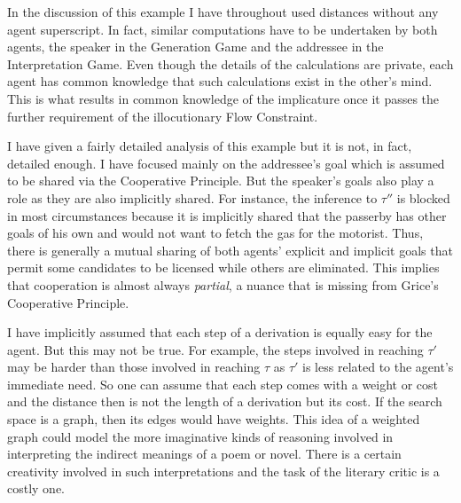 
In the discussion of this example I have throughout used distances without any agent superscript. In fact, similar computations have to be undertaken by both agents, the speaker in the Generation Game and the addressee in the Interpretation Game. Even though the details of the calculations are private, each agent has common knowledge that such calculations exist in the other's mind. This is what results in common knowledge of the implicature once it passes the further requirement of the illocutionary Flow Constraint.

I have given a fairly detailed analysis of this example but it is not, in fact, detailed enough. I have focused mainly on the addressee's goal which is assumed to be shared via the Cooperative Principle. But the speaker's goals also play a role as they are also implicitly shared. For instance, the inference to $\tau''$ is blocked in most circumstances because it is implicitly shared that the passerby has other goals of his own and would not want to fetch the gas for the motorist. Thus, there is generally a mutual sharing of both agents' explicit and implicit goals that permit some candidates to be licensed while others are eliminated. This implies that cooperation is almost always \emph{partial}, a nuance that is missing from Grice's Cooperative Principle.

I have implicitly assumed that each step of a derivation is equally easy for the agent. But this may not be true. For example, the steps involved in reaching $\tau'$ may be harder than those involved in reaching $\tau$  as $\tau'$ is less related to the agent's immediate need. So one can assume that each step comes with a weight or cost and the distance then is not the length of a derivation but its cost. If the search space is a graph, then its edges would have weights. This idea of a weighted graph could model the more imaginative kinds of reasoning involved in interpreting the indirect meanings of a poem or novel. There is a certain creativity involved in such interpretations and the task of the literary critic is a costly one.


